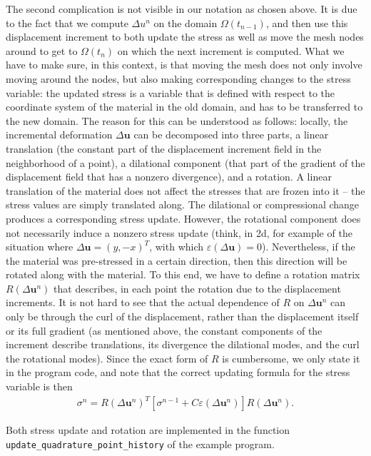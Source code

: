 \documentclass{article}
\renewcommand{\vec}[1]{\mathbf{#1}}
\begin{document}
The second complication is not visible in our notation as chosen above. It is
due to the fact that we compute $\Delta u^n$ on the domain $\Omega(t_{n-1})$,
and then use this displacement increment to both update the stress as well as
move the mesh nodes around to get to $\Omega(t_n)$ on which the next increment
is computed. What we have to make sure, in this context, is that moving the
mesh does not only involve moving around the nodes, but also making
corresponding changes to the stress variable: the updated stress is a variable
that is defined with respect to the coordinate system of the material in the
old domain, and has to be transferred to the new domain. The reason for this
can be understood as follows: locally, the incremental deformation $\Delta\vec
u$ can be decomposed into three parts, a linear translation (the constant part
of the displacement increment field in the neighborhood of a point), a
dilational 
component (that part of the gradient of the displacement field that has a
nonzero divergence), and a rotation. A linear translation of the material does
not affect the stresses that are frozen into it -- the stress values are
simply translated along. The dilational or compressional change produces a
corresponding stress update. However, the rotational component does not
necessarily induce a nonzero stress update (think, in 2d, for example of the
situation where $\Delta\vec u=(y, -x)^T$, with which $\varepsilon(\Delta \vec
u)=0$). Nevertheless, if the the material was pre-stressed in a certain
direction, then this direction will be rotated along with the material.  To
this end, we have to define a rotation matrix $R(\Delta \vec u^n)$ that
describes, in each point the rotation due to the displacement increments. It
is not hard to see that the actual dependence of $R$ on $\Delta \vec u^n$ can
only be through the curl of the displacement, rather than the displacement
itself or its full gradient (as mentioned above, the constant components of
the increment describe translations, its divergence the dilational modes, and
the curl the rotational modes). Since the exact form of $R$ is cumbersome, we
only state it in the program code, and note that the correct updating formula
for the stress variable is then
\begin{gather}
  \label{eq:stress-update+rot}
  \sigma^n
  = 
  R(\Delta \vec u^n)^T 
  [\sigma^{n-1} + C \varepsilon (\Delta \vec u^n)]
  R(\Delta \vec u^n).
\end{gather}

Both stress update and rotation are implemented in the function
\texttt{update\_\-quadrature\_\-point\_history} of the example program.
\end{document}
